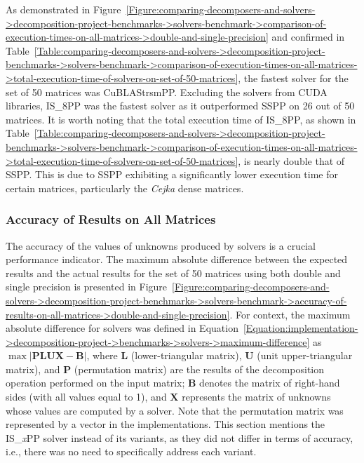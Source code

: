 As demonstrated in Figure~\ref{Figure:comparing-decomposers-and-solvers->decomposition-project-benchmarks->solvers-benchmark->comparison-of-execution-times-on-all-matrices->double-and-single-precision} and confirmed in Table~\ref{Table:comparing-decomposers-and-solvers->decomposition-project-benchmarks->solvers-benchmark->comparison-of-execution-times-on-all-matrices->total-execution-time-of-solvers-on-set-of-50-matrices}, the fastest solver for the set of 50 matrices was CuBLAStrsmPP.
Excluding the solvers from CUDA libraries, IS\_8PP was the fastest solver as it outperformed SSPP on 26 out of 50 matrices.
It is worth noting that the total execution time of IS\_8PP, as shown in Table~\ref{Table:comparing-decomposers-and-solvers->decomposition-project-benchmarks->solvers-benchmark->comparison-of-execution-times-on-all-matrices->total-execution-time-of-solvers-on-set-of-50-matrices}, is nearly double that of SSPP.
This is due to SSPP exhibiting a significantly lower execution time for certain matrices, particularly the \textit{Cejka} dense matrices.


\subsubsection{Accuracy of Results on All Matrices}\label{Subsection:comparing-decomposers-and-solvers->decomposition-project-benchmarks->solvers-benchmark->accuracy-of-results-on-all-matrices}
The accuracy of the values of unknowns produced by solvers is a crucial performance indicator.
The maximum absolute difference between the expected results and the actual results for the set of 50 matrices using both double and single precision is presented in Figure~\ref{Figure:comparing-decomposers-and-solvers->decomposition-project-benchmarks->solvers-benchmark->accuracy-of-results-on-all-matrices->double-and-single-precision}.
For context, the maximum absolute difference for solvers was defined in Equation~\ref{Equation:implementation->decomposition-project->benchmarks->solvers->maximum-difference} as $\max \left| \mathbf{PLUX} - \mathbf{B} \right|$, where $\mathbf{L}$ (lower-triangular matrix), $\mathbf{U}$ (unit upper-triangular matrix), and $\mathbf{P}$ (permutation matrix) are the results of the decomposition operation performed on the input matrix; $\mathbf{B}$ denotes the matrix of right-hand sides (with all values equal to 1), and $\mathbf{X}$ represents the matrix of unknowns whose values are computed by a solver.
Note that the permutation matrix was represented by a vector in the implementations.
This section mentions the IS\_\textit{x}PP solver instead of its variants, as they did not differ in terms of accuracy, i.e., there was no need to specifically address each variant.

